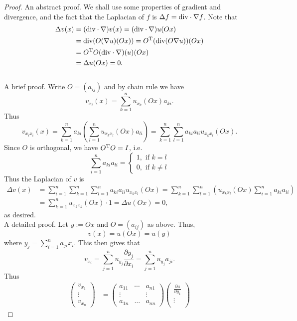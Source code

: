 \documentclass[hyperref,UTF8,12pt]{article}
\numberwithin{equation}{subsection}
\theoremstyle{plain}
\theoremstyle{definition}
\numberwithin{theorem}{section}
\numberwithin{lemma}{section}
\numberwithin{proposition}{section}
\numberwithin{remark}{section}
\numberwithin{corollary}{section}
\numberwithin{definition}{section}
\numberwithin{problem}{section}
\numberwithin{example}{section}
\def\T{\textup{T}}
\def\dv{\textup{div}}
\newcommand{\dis}{\displaystyle}
\newcommand{\ptl}{\partial}
\begin{document}
\begin{proof}
\textsf{An abstract proof.} We shall use some properties of gradient and divergence, and the fact that the Laplacian of $f$ is $\Delta f=\dv\cdot\nabla f$. Note that\[\begin{aligned}
	\Delta v(x)&=(\dv\cdot\nabla)v(x)=(\dv\cdot\nabla)u(Ox)\\
	&=\dv(O(\nabla u)(Ox))=O^\T(\dv(O\nabla u))(Ox)\\
	&=O^\T O(\dv\cdot\nabla)(u)(Ox)\\
	&=\Delta u(Ox)=0.
\end{aligned}\]\\
\textsf{A brief proof.} Write $O=(a_{ij})$ and by chain rule we have \[v_{x_i}(x)=\sum_{k=1}^nu_{x_k}(Ox)a_{ki}.\]Thus \[v_{x_ix_i}(x)= \sum_{k=1}^na_{ki}\left(\sum_{l=1}^nu_{x_kx_l}(Ox)a_{li}\right)=\sum_{k=1}^n\sum_{l=1}^na_{ki}a_{li}u_{x_kx_l}(Ox).\]Since $O$ is orthogonal, we have $O^\T O=I$, i.e. \[\sum_{i=1}^na_{ki}a_{li}=\left\{\begin{array}{c}
	1, \text{ if } k=l \\
	0, \text{ if } k\neq l
\end{array}\right.\]Thus the Laplacian of $v$ is \[\begin{aligned}
	\Delta v(x)&=\sum_{i=1}^n\sum_{k=1}^n\sum_{l=1}^na_{ki}a_{li}u_{x_kx_l} (Ox)=\sum_{k=1}^n\sum_{l=1}^n\left(u_{x_kx_l}(Ox)\sum_{i=1}^na_{ki}a_{li}\right)\\ &=\sum_{k=1}^nu_{x_kx_k}(Ox)\cdot1=\Delta u(Ox)=0,
\end{aligned}\]as desired.\\
\textsf{A detailed proof.} Let $y:=Ox$ and $O=(a_{i j})$ as above. Thus,\[v(x)=u(Ox)=u(y)\]where $y_j=\dis\sum_{i=1}^na_{ji}x_i$. This then gives that\[v_{x_i}=\sum_{j=1}^nu_{y_j}\frac{\ptl y_j}{\ptl x_i}=\sum_{j=1}^nu_{y_j}a_{ji}.\]Thus\[\begin{aligned}
	\begin{pmatrix}
		v_{x_1}\\
		\vdots \\
		v_{x_n}
	\end{pmatrix}
	&=\begin{pmatrix}
		a_{11} & \cdots & a_{n1} \\
		\vdots & & \vdots \\
		a_{1n} & \ldots & a_{n n}
	\end{pmatrix}
	\begin{pmatrix}
		\frac{\ptl u}{\ptl y_1} \\
		\vdots \\

\end{pmatrix}
\end{aligned}\]
\end{proof}
\end{document}
